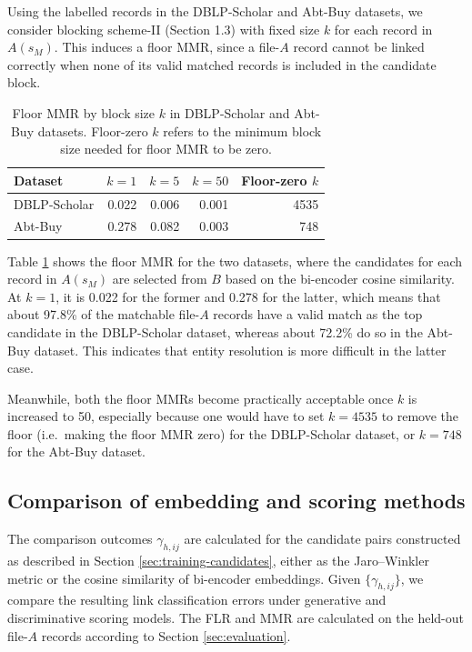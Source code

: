 Using the labelled records in the DBLP-Scholar and Abt-Buy datasets, we consider
blocking scheme-II (Section 1.3) with fixed size $k$ for each record in $A(s_M)$. This
induces a floor MMR, since a file-$A$ record cannot be linked correctly when none of its
valid matched records is included in the candidate block.

\begin{table}[ht]
\centering
\caption{Floor MMR by block size $k$ in DBLP-Scholar and Abt-Buy datasets.
Floor-zero $k$ refers to the minimum block size needed for floor MMR to be zero.}
\begin{tabular}{lrrrr}
\toprule
Dataset & $k=1$ & $k=5$ & $k=50$ & Floor-zero $k$ \\
\midrule
DBLP-Scholar & 0.022 & 0.006 & 0.001 & 4535 \\
Abt-Buy      & 0.278 & 0.082 & 0.003 & 748 \\
\bottomrule
\end{tabular}
\label{tab:floor-mmr}
\end{table}

Table \ref{tab:floor-mmr} shows the floor MMR for the two datasets, where the candidates
for each record in $A(s_M)$ are selected from $B$ based on the bi-encoder cosine
similarity. At $k=1$, it is 0.022 for the former and 0.278 for the latter, which means
that about 97.8\% of the matchable file-$A$ records have a valid match as the top
candidate in the DBLP-Scholar dataset, whereas about 72.2\% do so in the Abt-Buy
dataset. This indicates that entity resolution is more difficult in the latter case.

Meanwhile, both the floor MMRs become practically acceptable once $k$ is increased to
50, especially because one would have to set $k=4535$ to remove the floor (i.e.\ making
the floor MMR zero) for the DBLP-Scholar dataset, or $k=748$ for the Abt-Buy dataset.


\subsection{Comparison of embedding and scoring methods}
\label{sec:comparison-pretrained}

The comparison outcomes $\gamma_{h,ij}$ are calculated for the candidate pairs
constructed as described in Section \ref{sec:training-candidates}, either as the
Jaro--Winkler metric or the cosine similarity of bi-encoder embeddings. Given
$\{\gamma_{h,ij}\}$, we compare the resulting link classification errors under
generative and discriminative scoring models. The FLR and MMR are calculated on
the held-out file-$A$ records according to Section \ref{sec:evaluation}.

